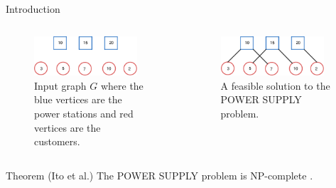 \begin{frame}{Introduction}
\begin{columns}
    \begin{column}{0.5\textwidth}
        \begin{figure}
        \centering
        \includegraphics[width=0.9\textwidth]{img/ps1.pdf}
        \caption{Input graph $G$ where the blue vertices are the power stations and red vertices are the customers.}
        \label{fig:ps}
        \end{figure}
    \end{column}
    \pause
    \begin{column}{0.5\textwidth}
        \begin{figure}
        \centering
        \includegraphics[width=0.9\textwidth]{img/ps2.pdf}
        \caption{A feasible solution to the POWER SUPPLY problem.\hfill \break}
        \label{fig:circle}
        \end{figure}
    \end{column}
\end{columns}

\begin{block}{Theorem (Ito et al.)}
The POWER SUPPLY problem is NP-complete \cite{DBLP:journals/tcs/ItoDHPSUU11}.
\end{block}
\end{frame}

